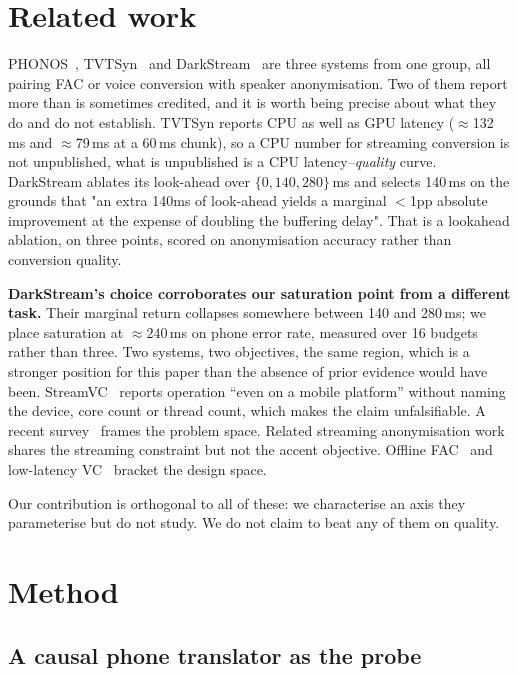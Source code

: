 \documentclass[9pt,a4paper,twocolumn]{article}
\begin{document}
\section{Related work}

PHONOS~\cite{phonos2026}, TVTSyn~\cite{tvtsyn2026} and
DarkStream~\cite{darkstream2025} are three systems from one group, all pairing
FAC or voice conversion with speaker anonymisation. Two of them report more
than is sometimes credited, and it is worth being precise about what they do
and do not establish. TVTSyn reports CPU as well as GPU latency
($\approx$132\,ms and $\approx$79\,ms at a 60\,ms chunk), so a CPU number
for streaming conversion is not unpublished, what is unpublished is a CPU
latency--\emph{quality} curve. DarkStream ablates its look-ahead over
$\{0, 140, 280\}$\,ms and selects 140\,ms on the grounds that "an extra
140ms of look-ahead yields a marginal $<$1pp absolute improvement at the
expense of doubling the buffering delay". That is a lookahead ablation, on
three points, scored on anonymisation accuracy rather than conversion quality.

\textbf{DarkStream's choice corroborates our saturation point from a different
task.} Their marginal return collapses somewhere between 140 and 280\,ms;
we place saturation at ${\approx}240$\,ms on phone error rate, measured over
16 budgets rather than three. Two systems, two objectives, the same region,
which is a stronger position for this paper than the absence of prior evidence
would have been.
StreamVC~\cite{streamvc2024} reports operation ``even on a mobile platform''
without naming the device, core count or thread count, which makes the claim
unfalsifiable. A recent survey~\cite{acsurvey2026} frames the problem space.
Related streaming anonymisation work~\cite{streamvoiceanon2026,
streamvoiceanonplus2026, e2eanon2024} shares the streaming constraint but not
the accent objective. Offline FAC~\cite{zhao2021fac, accentron2022} and
low-latency VC~\cite{llvc2023} bracket the design space.

Our contribution is orthogonal to all of these: we characterise an axis they
parameterise but do not study. We do not claim to beat any of them on quality.

\section{Method}

\subsection{A causal phone translator as the probe}
\label{sec:method-translator}
\end{document}
